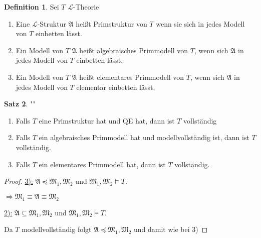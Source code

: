 \documentclass[12pt,parskip=full]{scrartcl}
\newcommand{\heading}{\underline}
\theoremstyle{definition}
\newtheorem{theorem}{Satz}[section]
\newtheorem{definition}[theorem]{Definition}
\begin{document}
	\begin{definition}
		Sei $T$ $\mathcal{L}$-Theorie
		\begin{enumerate}
			\item Eine $\mathcal{L}$-Struktur $\mathfrak{A}$ heißt Primstruktur von $T$ wenn sie sich in jedes Modell von $T$ einbetten lässt.
			\item Ein Modell von $T$ $\mathfrak{A}$ heißt algebraisches Primmodell von $T$, wenn sich $\mathfrak{A}$ in jedes Modell von $T$ einbetten lässt.
			\item Ein Modell von $T$ $\mathfrak{A}$ heißt elementares Primmodell von $T$, wenn sich $\mathfrak{A}$ in jedes Modell von $T$ elementar einbetten lässt.
		\end{enumerate}
	\end{definition}

	\begin{theorem}""
		\begin{enumerate}
			\item Falls $T$ eine Primstruktur hat und QE hat, dann ist $T$ vollständig
			\item Falls $T$ ein algebraisches Primmodell hat und modellvollständig ist, dann ist $T$ vollständig.
			\item Falls $T$ ein elementares Primmodell hat, dann ist $T$ vollständig.
		\end{enumerate}
	\end{theorem}

	\begin{proof}
		\heading{3):} $\mathfrak{A} \preccurlyeq \mathfrak{M}_1, \mathfrak{M}_2$ und $\mathfrak{M_1}, \mathfrak{M_2} \models T$.
		
		$\Rightarrow \mathfrak{M_1} \equiv \mathfrak{A} \equiv \mathfrak{M_2}$
		
		\heading{2):} $\mathfrak{A} \subseteq \mathfrak{M}_1, \mathfrak{M}_2$ und $\mathfrak{M_1}, \mathfrak{M_2} \models T$.
		
		Da $T$ modellvollständig folgt $\mathfrak{A} \preccurlyeq \mathfrak{M}_1, \mathfrak{M}_2$ und damit wie bei 3)
	\end{proof}
\end{document}
